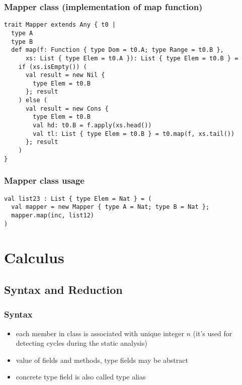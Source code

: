 \documentclass[aspectratio=169]{beamer}
\begin{document}
\begin{frame}[fragile]
\pause
\frametitle{Mapper class (implementation of map function)}
\begin{lstlisting}
trait Mapper extends Any { t0 |
  type A
  type B
  def map(f: Function { type Dom = t0.A; type Range = t0.B },
      xs: List { type Elem = t0.A }): List { type Elem = t0.B } =
    if (xs.isEmpty()) (
      val result = new Nil {
        type Elem = t0.B
      }; result
    ) else (
      val result = new Cons {
        type Elem = t0.B
        val hd: t0.B = f.apply(xs.head())
        val tl: List { type Elem = t0.B } = t0.map(f, xs.tail())
      }; result
    )
}
\end{lstlisting}
\end{frame}

\begin{frame}[fragile]
\frametitle{Mapper class usage}
\begin{lstlisting}
val list23 : List { type Elem = Nat } = (
  val mapper = new Mapper { type A = Nat; type B = Nat };
  mapper.map(inc, list12)
)
\end{lstlisting}
\end{frame}

\section{Calculus}

\subsection{Syntax and Reduction}

\begin{frame}
\frametitle{Syntax}
\begin{itemize}
 \item each member in class is associated with unique integer $n$ (it's used for detecting cycles during the static analysis)
 \item value of fields and methods, type fields may be abstract
 \item concrete type field is also called type alias
\end{itemize}
\end{frame}
\end{document}
